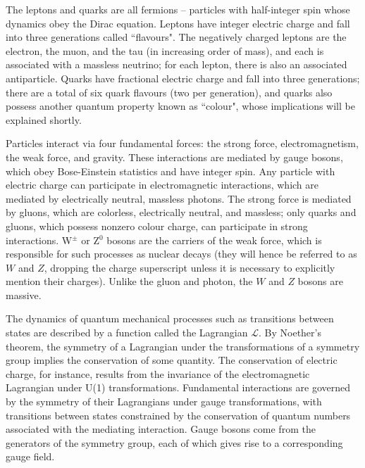 The leptons and quarks are all fermions -- particles with half-integer spin whose dynamics obey the Dirac equation. Leptons have integer electric charge and fall into three generations called ``flavours". The negatively charged leptons are the electron, the muon, and the tau (in increasing order of mass), and each is associated with a massless neutrino; for each lepton, there is also an associated antiparticle. Quarks have fractional electric charge and fall into three generations; there are a total of six quark flavours (two per generation), and quarks also possess another quantum property known as ``colour", whose implications will be explained shortly.

Particles interact via four fundamental forces: the strong force, electromagnetism, the weak force, and gravity. These interactions are mediated by gauge bosons, which obey Bose-Einstein statistics and have integer spin. Any particle with electric charge can participate in electromagnetic interactions, which are mediated by electrically neutral, massless photons. The strong force is mediated by gluons, which are colorless, electrically neutral, and massless; only quarks and gluons, which possess nonzero colour charge, can participate in strong interactions. W$^{\pm}$ or Z$^{0}$ bosons are the carriers of the weak force, which is responsible for such processes as nuclear decays (they will hence be referred to as $W$ and $Z$, dropping the charge superscript unless it is necessary to explicitly mention their charges). Unlike the gluon and photon, the $W$ and $Z$ bosons are massive.

The dynamics of quantum mechanical processes such as transitions between states are described by a function called the Lagrangian $\mathcal{L}$. By Noether's theorem, the symmetry of a Lagrangian under the transformations of a symmetry group implies the conservation of some quantity. The conservation of electric charge, for instance, results from the invariance of the electromagnetic Lagrangian under U(1) transformations. Fundamental interactions are governed by the symmetry of their Lagrangians under gauge transformations, with transitions between states constrained by the conservation of quantum numbers associated with the mediating interaction. Gauge bosons come from the generators of the symmetry group, each of which gives rise to a corresponding gauge field.


